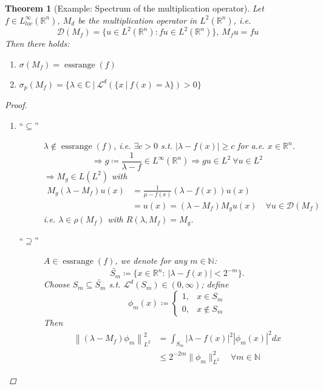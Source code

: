 \documentclass[12pt]{extreport} %
\newcommand{\C}{\mathbb{C}}
\newcommand{\N}{\mathbb{N}}
\newcommand{\R}{\mathbb{R}}
\newcommand{\DO}[1]{\mathcal{D}\left( {#1} \right)}
\theoremstyle{named}
\theoremstyle{nnamed}
\theoremstyle{itshape}
\newtheorem{theorem}{Theorem}  \counterwithin{theorem}{chapter}
\theoremstyle{normal}
\begin{document}
\begin{theorem}[Example: Spectrum of the multiplication operator]
	Let $f \in L_{loc}^\infty(\R^n)$, $M_d$ be the multiplication operator in $L^2(\R^n)$, i.e.
	$$ \DO{M_f} = \big\{ u \in L^2(\R^n) : fu \in L^2(\R^n) \}, ~M_f u = fu $$
	Then there holds:
	\begin{enumerate}[label=(\roman*\upshape)]
		\item $\sigma(M_f) = \operatorname{essrange}(f)$
		\item $\sigma_p(M_f) = \big\{ \lambda \in \C ~|~ \mathcal{L}^d \left( \{ x ~|~f(x) = \lambda \} \right) > 0 \big\}$
	\end{enumerate}
	
	\begin{proof} ~\
	  \begin{enumerate}[label=(\roman*\upshape)]
		\item \begin{description}
			\item[\enquote{$\subseteq$}] $\lambda \notin \operatorname{essrange}(f)$, i.e. $\exists c > 0$ s.t. $|\lambda - f(x)| \geq c$ for a.e. $x \in \R^n$.
				$$ \Rightarrow g \coloneqq \frac{1}{\lambda - f} \in L^\infty(\R^n) \Rightarrow gu \in L^2 ~\forall u \in L^2 $$
				$ \Rightarrow M_g \in L(L^2)$ with
				\begin{align*}
					M_g(\lambda - M_f) u(x) & = \frac{1}{\mu - f(x)} \left( \lambda - f(x) \right) u(x) \\
					&= u(x) = \left( \lambda - M_f \right) M_g u(x) \quad \forall u \in \DO{M_f} 
				\end{align*}
				i.e. $\lambda \in \rho(M_f)$ with $R(\lambda, M_f) = M_g$.
			\item[\enquote{$\supseteq$}] $A \in \operatorname{essrange}(f)$, we denote for any $m \in \N$:
					$$ \tilde{S_m} \coloneqq \big\{ x \in \R^n \colon ~ |\lambda - f(x)| < 2^{-m} \big\}. $$
				Choose $S_m \subseteq \tilde{S_m}$ s.t. $\mathcal{L}^d(S_m) \in (0, \infty)$; define
					$$ \phi_m(x) \coloneqq \begin{cases} 1, & x \in S_m \\ 0, & x \notin S_m \end{cases} $$
				Then
					\begin{align*}
						\left\| \left( \lambda - M_f \right) \phi_m \right\|^2_{L^2} & = \int_{S_m} \left| \lambda - f(x) \right|^2 \left| \phi_m(x) \right|^2 dx \\
							& \leq 2^{-2m} \| \phi_m\|_{L^2}^2 \quad \forall m \in \N
					\end{align*}

\end{description}
\end{enumerate}
\end{proof}
\end{theorem}
\end{document}

